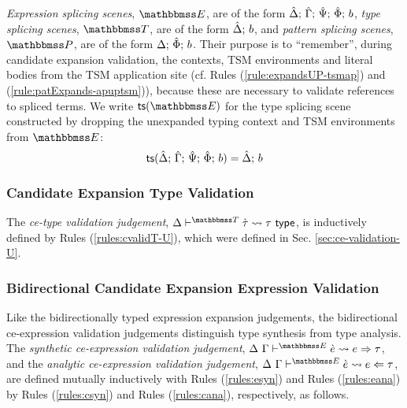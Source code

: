 \emph{Expression splicing scenes}, $\escenev$, are of the form $\hat{\Delta};\,\hat{\Gamma};\,\hat{\Psi};\,\hat\Phi;\,b$, \emph{type splicing scenes}, $\tscenev$, are of the form $\hat{\Delta};\,b$, and \emph{pattern splicing scenes}, $\pscenev$, are of the form $\Delta;\,\hat\Phi;\,b$. Their purpose is to ``remember'', during candidate expansion validation, the contexts, TSM environments and literal bodies from the TSM application site (cf. Rules (\ref{rule:expandsUP-tsmap}) and (\ref{rule:patExpands-apuptsm})), because these are necessary to validate references to spliced terms. We write $\tsfrom{\escenev}$ for the type splicing scene constructed by dropping the unexpanded typing context and TSM environments from $\escenev$:
\[\mathsf{ts}(\hat{\Delta};\,\hat{\Gamma};\,\hat{\Psi};\,\hat\Phi;\,b) = \hat{\Delta};\,b\]

\subsubsection{Candidate Expansion Type Validation}
The \emph{ce-type validation judgement}, $\cvalidT{\Delta}{\tscenev}{\ctau}{\tau}$, is inductively defined by Rules (\ref{rules:cvalidT-U}), which were defined in Sec. \ref{sec:ce-validation-U}.

\subsubsection{Bidirectional Candidate Expansion Expression Validation}
Like the bidirectionally typed expression expansion judgements, the bidirectional ce-expression validation judgements distinguish type synthesis from type analysis. The \emph{synthetic ce-expression validation judgement}, $\csynX{\ce}{e}{\tau}$, and the \emph{analytic ce-expression validation judgement}, $\canaX{\ce}{e}{\tau}$, are defined mutually inductively with Rules (\ref{rules:esyn}) and Rules (\ref{rules:eana}) by Rules (\ref{rules:csyn}) and Rules (\ref{rules:cana}), respectively, as follows.

